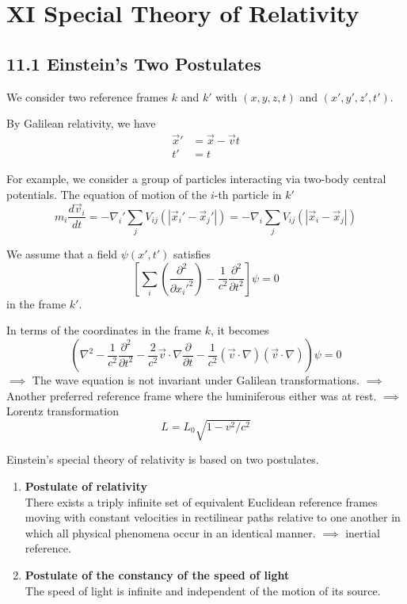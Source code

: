 \documentclass{article}
\begin{document}
	
	\section*{XI Special Theory of Relativity}
	
	\subsection*{11.1 Einstein's Two Postulates}
	
	We consider two reference frames $k$ and $k'$ with $(x, y, z, t)$ and $(x', y', z', t')$.
	
	By Galilean relativity, we have
	\begin{align*}
		\vec{x}' &= \vec{x} - \vec{v}t \\
		t' &= t
	\end{align*}
	
	For example, we consider a group of particles interacting via two-body central potentials.
	The equation of motion of the $i$-th particle in $k'$
	\[ m_i \frac{d\vec{v}_i}{dt} = -\nabla_i' \sum_j V_{ij}(|\vec{x}_i' - \vec{x}_j'|) = -\nabla_i \sum_j V_{ij}(|\vec{x}_i - \vec{x}_j|) \]
	
	We assume that a field $\psi(x', t')$ satisfies
	\[ \left[ \sum_i \left( \frac{\partial^2}{\partial {x_i'}^2} \right) - \frac{1}{c^2} \frac{\partial^2}{\partial t^2} \right] \psi = 0 \]
	in the frame $k'$.
	
	In terms of the coordinates in the frame $k$, it becomes
	\[ \left( \nabla^2 - \frac{1}{c^2} \frac{\partial^2}{\partial t^2} - \frac{2}{c^2} \vec{v} \cdot \nabla \frac{\partial}{\partial t} - \frac{1}{c^2} (\vec{v} \cdot \nabla)(\vec{v} \cdot \nabla) \right) \psi = 0 \]
	$\implies$ The wave equation is not invariant under Galilean transformations.
	$\implies$ Another preferred reference frame where the luminiferous either was at rest.
	$\implies$ Lorentz transformation
	\[ L = L_0 \sqrt{1-v^2/c^2} \]
	
	Einstein's special theory of relativity is based on two postulates.
	\begin{enumerate}
		\item \textbf{Postulate of relativity} \\
		There exists a triply infinite set of equivalent Euclidean reference frames moving with constant velocities in rectilinear paths relative to one another in which all physical phenomena occur in an identical manner.
		$\implies$ inertial reference.
		
		\item \textbf{Postulate of the constancy of the speed of light} \\
		The speed of light is infinite and independent of the motion of its source.
	\end{enumerate}
	
\end{document}
